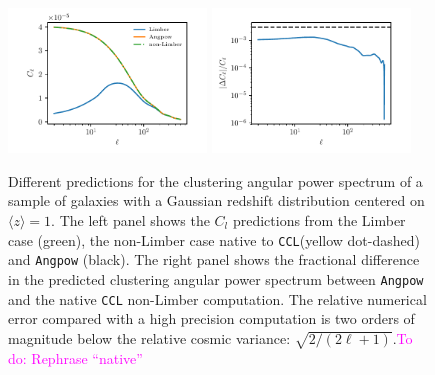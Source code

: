 \documentclass[\docopts]{\docclass}
\newcommand{\todo}[1]{\textcolor{magenta}{To do: #1}}
\newcommand{\ccl}{{\tt CCL}\xspace}
\begin{document}
\begin{figure}[htbp]
\centering
\includegraphics[width=0.47\textwidth]{angpow1}
\includegraphics[width=0.47\textwidth]{angpow3}
\caption{Different predictions for the clustering angular power spectrum of a sample of galaxies with a Gaussian redshift distribution centered on $\langle z \rangle =1$. The left panel shows the $C_l$ predictions from the Limber case (green), the non-Limber case native to \ccl (yellow dot-dashed) and {\tt Angpow} (black). The right panel shows the fractional difference in the predicted clustering angular power spectrum between {\tt Angpow} and the native \ccl non-Limber computation. The relative numerical error compared with a high precision computation is two orders of magnitude below the relative cosmic variance: $\sqrt{2/(2\ell+1)}$.\todo{Rephrase ``native''}}
\label{fig:angpow}
\end{figure}
\end{document}
